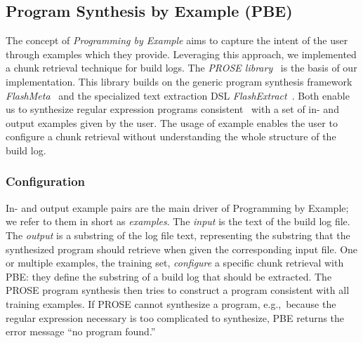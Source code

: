 \subsection{Program Synthesis by Example (PBE)}
The concept of \emph{Programming by Example} aims to capture the
intent of the user through examples which they provide.
Leveraging this approach, we implemented a chunk retrieval technique
for build logs.
The \emph{PROSE library}~\cite{prose2019webpage} is the basis of
our implementation.
This library builds on the generic program synthesis framework
\emph{FlashMeta}~\cite{polozov2015flashmeta:} and the specialized
text extraction DSL \emph{FlashExtract}~\cite{le2014flashextract:}.
Both enable us to synthesize regular expression programs
consistent~\cite{mitchell1982generalization} with a set of in-
and output examples given by the user.
The usage of example enables the user to configure a chunk
retrieval without understanding the whole structure of
the build log.

\subsubsection{Configuration}
In- and output example pairs are the main driver of Programming by
Example; we refer to them in short as \emph{examples}.
The \emph{input} is the text of the build log file.
The \emph{output} is
a substring of the log file text, representing the
substring that the synthesized program should retrieve when
given the corresponding input file.
One or multiple examples, the
training set, \emph{configure} a specific chunk retrieval with PBE:
they define the substring of a build log that should be extracted.
The PROSE program synthesis then tries to construct a program
consistent with all training examples.
If PROSE cannot synthesize a program, e.g.,\
because the regular expression
necessary is too complicated to synthesize, PBE returns the
error message ``no program found.''

